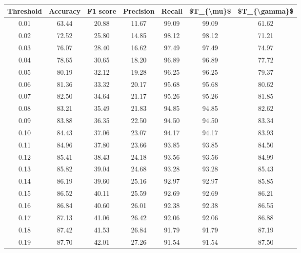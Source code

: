 \begin{tabular}{|c|c|c|c|c|c|c|}
\hline
 Threshold &  Accuracy &  F1 score &  Precision &  Recall &  \$T\_\{\textbackslash mu\}\$ &  \$T\_\{\textbackslash gamma\}\$ \\
\hline
      0.01 &     63.44 &     20.88 &      11.67 &   99.09 &      99.09 &         61.62 \\
      0.02 &     72.52 &     25.80 &      14.85 &   98.12 &      98.12 &         71.21 \\
      0.03 &     76.07 &     28.40 &      16.62 &   97.49 &      97.49 &         74.97 \\
      0.04 &     78.65 &     30.65 &      18.20 &   96.89 &      96.89 &         77.72 \\
      0.05 &     80.19 &     32.12 &      19.28 &   96.25 &      96.25 &         79.37 \\
      0.06 &     81.36 &     33.32 &      20.17 &   95.68 &      95.68 &         80.62 \\
      0.07 &     82.50 &     34.64 &      21.17 &   95.26 &      95.26 &         81.85 \\
      0.08 &     83.21 &     35.49 &      21.83 &   94.85 &      94.85 &         82.62 \\
      0.09 &     83.88 &     36.35 &      22.50 &   94.50 &      94.50 &         83.34 \\
      0.10 &     84.43 &     37.06 &      23.07 &   94.17 &      94.17 &         83.93 \\
      0.11 &     84.96 &     37.80 &      23.66 &   93.85 &      93.85 &         84.50 \\
      0.12 &     85.41 &     38.43 &      24.18 &   93.56 &      93.56 &         84.99 \\
      0.13 &     85.82 &     39.04 &      24.68 &   93.28 &      93.28 &         85.43 \\
      0.14 &     86.19 &     39.60 &      25.16 &   92.97 &      92.97 &         85.85 \\
      0.15 &     86.52 &     40.11 &      25.59 &   92.69 &      92.69 &         86.21 \\
      0.16 &     86.84 &     40.60 &      26.01 &   92.38 &      92.38 &         86.55 \\
      0.17 &     87.13 &     41.06 &      26.42 &   92.06 &      92.06 &         86.88 \\
      0.18 &     87.42 &     41.53 &      26.84 &   91.79 &      91.79 &         87.19 \\
      0.19 &     87.70 &     42.01 &      27.26 &   91.54 &      91.54 &         87.50 \\

\end{tabular}
